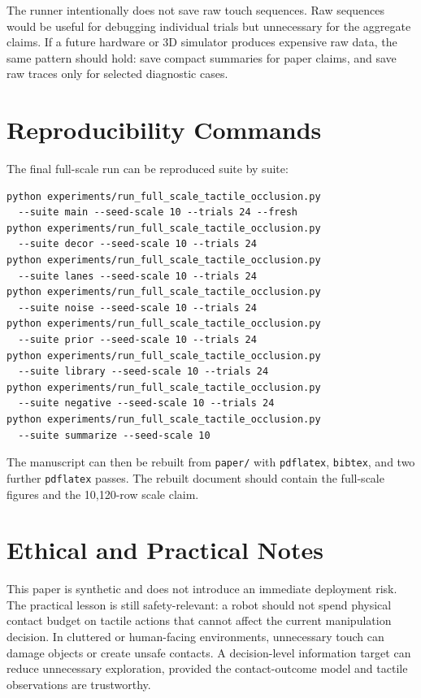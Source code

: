 \documentclass{article}
\begin{document}
The runner intentionally does not save raw touch sequences. Raw sequences would be useful for debugging individual trials but unnecessary for the aggregate claims. If a future hardware or 3D simulator produces expensive raw data, the same pattern should hold: save compact summaries for paper claims, and save raw traces only for selected diagnostic cases.

\section{Reproducibility Commands}

The final full-scale run can be reproduced suite by suite:

\begin{verbatim}
python experiments/run_full_scale_tactile_occlusion.py
  --suite main --seed-scale 10 --trials 24 --fresh
python experiments/run_full_scale_tactile_occlusion.py
  --suite decor --seed-scale 10 --trials 24
python experiments/run_full_scale_tactile_occlusion.py
  --suite lanes --seed-scale 10 --trials 24
python experiments/run_full_scale_tactile_occlusion.py
  --suite noise --seed-scale 10 --trials 24
python experiments/run_full_scale_tactile_occlusion.py
  --suite prior --seed-scale 10 --trials 24
python experiments/run_full_scale_tactile_occlusion.py
  --suite library --seed-scale 10 --trials 24
python experiments/run_full_scale_tactile_occlusion.py
  --suite negative --seed-scale 10 --trials 24
python experiments/run_full_scale_tactile_occlusion.py
  --suite summarize --seed-scale 10
\end{verbatim}

The manuscript can then be rebuilt from \texttt{paper/} with \texttt{pdflatex}, \texttt{bibtex}, and two further \texttt{pdflatex} passes. The rebuilt document should contain the full-scale figures and the 10,120-row scale claim.

\section{Ethical and Practical Notes}

This paper is synthetic and does not introduce an immediate deployment risk. The practical lesson is still safety-relevant: a robot should not spend physical contact budget on tactile actions that cannot affect the current manipulation decision. In cluttered or human-facing environments, unnecessary touch can damage objects or create unsafe contacts. A decision-level information target can reduce unnecessary exploration, provided the contact-outcome model and tactile observations are trustworthy.
\end{document}
